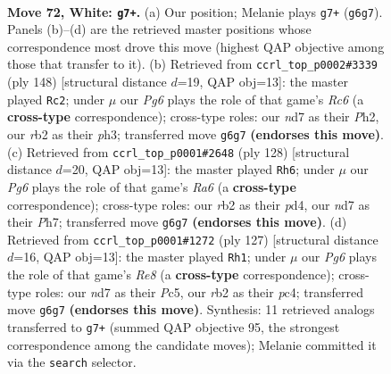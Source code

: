 \documentclass[11pt]{article}
\begin{document}
\clearpage

\begin{figure}[p]\centering
\begin{subfigure}{0.46\textwidth}\centering
\resizebox{\linewidth}{!}{%
\newchessgame
\chessboard[
  setfen={7k/3n1R2/6P1/8/p1p5/P1P4p/1r5P/6K1 w - - 0 72},
  showmover=false,
  pgfstyle=straightmove, color=movearrow, markmove={g6-g7}
]}
\caption{}
\end{subfigure}\hfill
\begin{subfigure}{0.46\textwidth}\centering
\resizebox{\linewidth}{!}{%
\newchessgame
\chessboard[
  setfen={8/5k2/2R5/4p1p1/6P1/4KP1p/7P/7r w - - 19 75},
  showmover=false,
  pgfstyle=straightmove, color=movearrow, markmove={c6-c2}
]}
\caption{}
\end{subfigure}
\\[4pt]
\begin{subfigure}{0.46\textwidth}\centering
\resizebox{\linewidth}{!}{%
\newchessgame
\chessboard[
  setfen={7r/5k1P/R7/4p1p1/3p2P1/5P2/6K1/8 w - - 11 65},
  showmover=false,
  pgfstyle=straightmove, color=movearrow, markmove={a6-h6}
]}
\caption{}
\end{subfigure}\hfill
\begin{subfigure}{0.46\textwidth}\centering
\resizebox{\linewidth}{!}{%
\newchessgame
\chessboard[
  setfen={8/5k2/2R5/2p4p/1pP5/5K1P/1P6/4r3 b - - 2 64},
  showmover=false,
  pgfstyle=straightmove, color=movearrow, markmove={e1-h1}
]}
\caption{}
\end{subfigure}
\caption{\textbf{Move 72, White: \texttt{g7+}.} (a) Our position; Melanie plays \texttt{g7+} (\texttt{g6g7}). Panels (b)--(d) are the retrieved master positions whose correspondence most drove this move (highest QAP objective among those that transfer to it). (b) Retrieved from \texttt{ccrl\_top\_p0002\#3339} (ply 148) [structural distance $d$=19, QAP obj=13]: the master played \texttt{Rc2}; under $\mu$ our \emph{Pg6} plays the role of that game's \emph{Rc6} (a \textbf{cross-type} correspondence); cross-type roles: our \emph{n}d7 as their \emph{P}h2, our \emph{r}b2 as their \emph{p}h3; transferred move \texttt{g6g7} \textbf{(endorses this move)}. (c) Retrieved from \texttt{ccrl\_top\_p0001\#2648} (ply 128) [structural distance $d$=20, QAP obj=13]: the master played \texttt{Rh6}; under $\mu$ our \emph{Pg6} plays the role of that game's \emph{Ra6} (a \textbf{cross-type} correspondence); cross-type roles: our \emph{r}b2 as their \emph{p}d4, our \emph{n}d7 as their \emph{P}h7; transferred move \texttt{g6g7} \textbf{(endorses this move)}. (d) Retrieved from \texttt{ccrl\_top\_p0001\#1272} (ply 127) [structural distance $d$=16, QAP obj=13]: the master played \texttt{Rh1}; under $\mu$ our \emph{Pg6} plays the role of that game's \emph{Re8} (a \textbf{cross-type} correspondence); cross-type roles: our \emph{n}d7 as their \emph{P}c5, our \emph{r}b2 as their \emph{p}c4; transferred move \texttt{g6g7} \textbf{(endorses this move)}. Synthesis: 11 retrieved analogs transferred to \texttt{g7+} (summed QAP objective 95, the strongest correspondence among the candidate moves); Melanie committed it via the \texttt{search} selector.}
\label{fig:thought-m142}
\end{figure}
\end{document}
